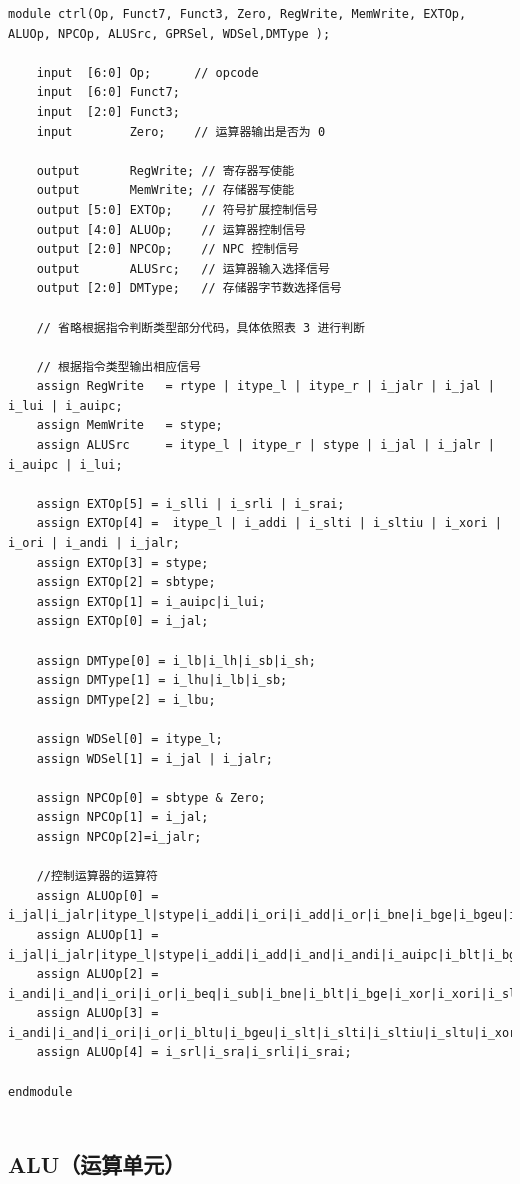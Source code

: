\documentclass[UTF8,a4paper,autofakebold,15pt]{ctexart}
\begin{document}
{\lstset{language=verilog}
	\begin{lstlisting}
module ctrl(Op, Funct7, Funct3, Zero, RegWrite, MemWrite, EXTOp, ALUOp, NPCOp, ALUSrc, GPRSel, WDSel,DMType );

	input  [6:0] Op;      // opcode
	input  [6:0] Funct7;  
	input  [2:0] Funct3;  
	input        Zero;	  // 运算器输出是否为 0
	
	output       RegWrite; // 寄存器写使能
	output       MemWrite; // 存储器写使能
	output [5:0] EXTOp;    // 符号扩展控制信号
	output [4:0] ALUOp;    // 运算器控制信号
	output [2:0] NPCOp;    // NPC 控制信号
	output       ALUSrc;   // 运算器输入选择信号
	output [2:0] DMType;   // 存储器字节数选择信号

	// 省略根据指令判断类型部分代码，具体依照表 3 进行判断

	// 根据指令类型输出相应信号
	assign RegWrite   = rtype | itype_l | itype_r | i_jalr | i_jal | i_lui | i_auipc;
	assign MemWrite   = stype;     
	assign ALUSrc     = itype_l | itype_r | stype | i_jal | i_jalr | i_auipc | i_lui;  
	
	assign EXTOp[5] = i_slli | i_srli | i_srai;
	assign EXTOp[4] =  itype_l | i_addi | i_slti | i_sltiu | i_xori | i_ori | i_andi | i_jalr;  
	assign EXTOp[3] = stype; 
	assign EXTOp[2] = sbtype; 
	assign EXTOp[1] = i_auipc|i_lui;   
	assign EXTOp[0] = i_jal;         

	assign DMType[0] = i_lb|i_lh|i_sb|i_sh;
	assign DMType[1] = i_lhu|i_lb|i_sb;
	assign DMType[2] = i_lbu;
	
	assign WDSel[0] = itype_l;
	assign WDSel[1] = i_jal | i_jalr;
	
	assign NPCOp[0] = sbtype & Zero;
	assign NPCOp[1] = i_jal;
	assign NPCOp[2]=i_jalr;
	
	//控制运算器的运算符
	assign ALUOp[0] = i_jal|i_jalr|itype_l|stype|i_addi|i_ori|i_add|i_or|i_bne|i_bge|i_bgeu|i_sltiu|i_sltu|i_slli|i_sll|i_sra|i_srai|i_lui;
	assign ALUOp[1] = i_jal|i_jalr|itype_l|stype|i_addi|i_add|i_and|i_andi|i_auipc|i_blt|i_bge|i_slt|i_slti|i_sltiu|i_sltu|i_slli|i_sll;
	assign ALUOp[2] = i_andi|i_and|i_ori|i_or|i_beq|i_sub|i_bne|i_blt|i_bge|i_xor|i_xori|i_sll|i_slli;
	assign ALUOp[3] = i_andi|i_and|i_ori|i_or|i_bltu|i_bgeu|i_slt|i_slti|i_sltiu|i_sltu|i_xor|i_xori|i_sll|i_slli;
	assign ALUOp[4] = i_srl|i_sra|i_srli|i_srai;

endmodule
		
\end{lstlisting}}

\subsection{ALU（运算单元）}
\end{document}
